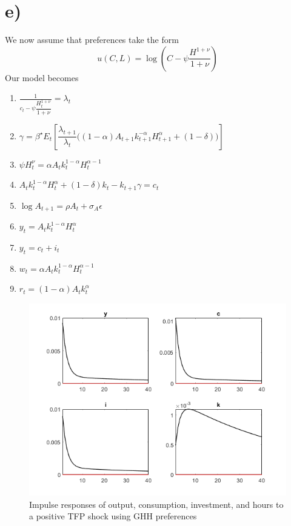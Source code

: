 \documentclass[10pt,letter]{article}
\begin{document}
\section*{e)}
We now assume that preferences take the form
\begin{equation*}
	u(C, L) = \log \left(C - \psi \dfrac{H^{1+\nu}}{1+\nu}\right)
\end{equation*}
Our model becomes 
\begin{enumerate}
	\item $\frac{1}{c_t-\psi \dfrac{H_{t}^{1+\nu}}{1+\nu}} = \lambda_t$
	\item $\gamma = \beta^{\star}E_t\left[\dfrac{\lambda_{t+1}}{\lambda_{t}}\bigg((1-\alpha)A_{t+1} k_{t+1}^{-\alpha}H_{t+1}^{\alpha} + (1-\delta)\bigg)\right]$
	\item $\psi H_{t}^{\nu} = \alpha A_{t}k_{t}^{1-\alpha}H_{t}^{\alpha-1}$
	\item $A_{t}k_{t}^{1-\alpha}H_{t}^{\alpha} + (1-\delta)k_{t}-k_{t+1}\gamma = c_{t}$
	\item $\log A_{t+1} = \rho A_{t} + \sigma_{A}\epsilon$
	\item $y_{t} = A_{t}k_{t}^{1-\alpha}H_{t}^{\alpha}$
	\item $y_{t} = c_{t} + i_{t}$
	\item $w_{t} = \alpha A_{t}k_{t}^{1-\alpha}H_{t}^{\alpha-1}$
	\item $r_t = (1-\alpha)A_{t}k_{t}^{\alpha}$
\end{enumerate}
\begin{figure}[H]
	\centering
	\includegraphics[width=1\linewidth]{irfs_yich_ghh.png}
	\caption{Impulse responses of output, consumption, investment, and hours to a positive TFP shock using GHH preferences}
	\label{fig:GHH_irfs}
\end{figure} 
\end{document}
